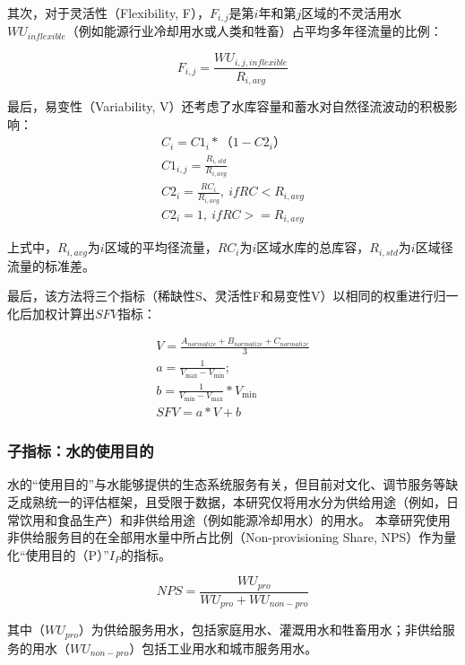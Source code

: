 其次，对于灵活性（Flexibility, F），$F_{i, j}$是第$i$年和第$j$区域的不灵活用水$WU_{inflexible}$（例如能源行业冷却用水或人类和牲畜）占平均多年径流量的比例：

\begin{equation}
    F_{i, j} = \frac{WU_{i, j, inflexible}}{R_{i, avg}}
\end{equation}

最后，易变性（Variability, V）还考虑了水库容量和蓄水对自然径流波动的积极影响：
\begin{gather}
    C_i = C1_i * （1 - C2_i） \\
    C1_{i, j} = \frac{R_{i, std}}{R_{i, avg}} \\
    C2_{i} = \frac{RC_{i}}{R_{i, avg}}, \ if RC < R_{i, avg} \\
    C2_{i} = 1, \ if RC >= R_{i, avg}
\end{gather}

上式中，$R_{i, avg}$为$i$区域的平均径流量，$RC_i$为$i$区域水库的总库容，$R_{i, std}$为$i$区域径流量的标准差。

最后，该方法将三个指标（稀缺性S、灵活性F和易变性V）以相同的权重进行归一化后加权计算出$SFV$指标：

\begin{gather}
    V = \frac{A_{normalize} + B_{normalize} + C_{normalize}}{3}\\
    a = \frac{1}{V_{\max} - V_{\min}};\\
    b = \frac{1}{V_{\min} - V_{\max}} * V_{\min}\\
    SFV = a * V + b
\end{gather}


\subsubsection{子指标：水的使用目的}

水的“使用目的”与水能够提供的生态系统服务有关，但目前对文化、调节服务等缺乏成熟统一的评估框架，且受限于数据，本研究仅将用水分为供给用途（例如，日常饮用和食品生产）和非供给用途（例如能源冷却用水）的用水\cite{liu2017,florke2018,jaeger2019}。
本章研究使用非供给服务目的在全部用水量中所占比例（Non-provisioning Share, NPS）作为量化“使用目的（P）”$I_P$的指标。

\begin{equation}
    NPS = \frac{WU_{pro}}{WU_{pro} + WU_{non-pro}}
\label{ch4:eq:priority}
\end{equation}

其中（$WU_{pro}$）为供给服务用水，包括家庭用水、灌溉用水和牲畜用水；非供给服务的用水（$WU_{non-pro}$）包括工业用水和城市服务用水。

